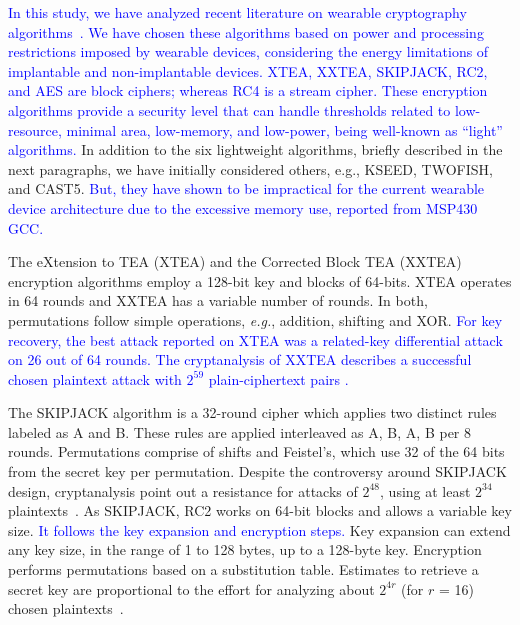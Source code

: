 \documentclass[journal]{IEEEtran}
\newcommand{\rever}{\textcolor{blue}}
\begin{document}
\rever{In this study, we have analyzed recent literature on wearable cryptography algorithms~\cite{cazorla2013survey, sallam2018survey, dener2018comparison}. We have chosen these algorithms based on power and processing restrictions imposed by wearable devices, considering the energy limitations of implantable and non-implantable devices. XTEA, XXTEA, SKIPJACK, RC2, and AES are block ciphers; whereas RC4 is a stream cipher. These encryption algorithms %
provide %
a security level that can handle thresholds related to low-resource, minimal area, low-memory, and low-power, being well-known as “light” algorithms.} In addition to the six lightweight algorithms, briefly described in the next paragraphs, we have initially considered others, e.g., KSEED, TWOFISH, and CAST5. \rever{But, they have shown to be impractical for the current wearable device architecture due to the excessive memory use, reported from MSP430 GCC.} %

The eXtension to TEA (XTEA) and the Corrected Block TEA (XXTEA) encryption algorithms employ a 128-bit key and blocks of 64-bits. XTEA operates in 64 rounds and XXTEA has a variable number of rounds. In both, permutations follow simple operations, {\em e.g.}, addition, shifting and XOR. \rever{For key recovery, %
the best attack reported on XTEA was a related-key differential attack on 26 out of 64 rounds. The cryptanalysis of XXTEA describes a successful chosen plaintext attack with $2^{59}$ plain-ciphertext pairs \cite{sallam2018survey}.}




The SKIPJACK algorithm is a 32-round cipher which applies two distinct rules labeled as A and B. These rules are applied interleaved as A, B, A, B per 8 rounds. Permutations comprise of shifts and Feistel's, which use 32 of the 64 bits from the secret key per permutation. Despite the controversy around SKIPJACK design, cryptanalysis point out a resistance for attacks of $2^{48}$, using at least $2^{34}$ plaintexts~\cite{biham2005cryptanalysis}. As SKIPJACK, RC2 works on 64-bit blocks and allows a variable key size. \rever{It follows the key expansion and encryption steps.} Key expansion can extend any key size, in the range of 1 to 128 bytes, up to a 128-byte key. Encryption performs permutations based on a substitution table. Estimates to retrieve a secret key are proportional to the effort for analyzing about $2^{4r}$ (for $r$ = 16) chosen plaintexts~\cite{knudsen1998design}. %
\end{document}
